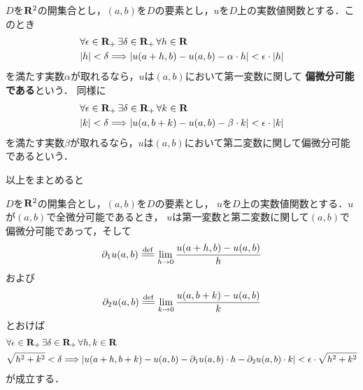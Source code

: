 	\begin{screen}
		\begin{dfn}[偏微分]\label{def:partially_differentiability}
			$D$を$\mathbf{R}^2$の開集合とし，$(a,b)$を$D$の要素とし，$u$を$D$上の実数値関数とする．このとき
			\begin{align}
				&\forall \epsilon \in \mathbf{R}_+\, \exists \delta \in \mathbf{R}_+\, \forall h \in \mathbf{R}\, \\
				&|h| < \delta \Longrightarrow
				\left|u(a+h,b) - u(a,b) - \alpha \cdot h\right| < \epsilon \cdot |h|
			\end{align}
			を満たす実数$\alpha$が取れるなら，$u$は$(a,b)$において第一変数に関して
			{\bf 偏微分可能である}という．
			同様に
			\begin{align}
				&\forall \epsilon \in \mathbf{R}_+\, \exists \delta \in \mathbf{R}_+\, \forall k \in \mathbf{R}\, \\
				&|k| < \delta \Longrightarrow
				\left|u(a,b+k) - u(a,b) - \beta \cdot k\right| < \epsilon \cdot |k|
			\end{align}
			を満たす実数$\beta$が取れるなら，$u$は$(a,b)$において第二変数に関して偏微分可能であるという．
		\end{dfn}
	\end{screen}
	
	以上をまとめると
	
	\begin{screen}
		\begin{thm}[全微分可能なら偏微分可能]
			$D$を$\mathbf{R}^2$の開集合とし，$(a,b)$を$D$の要素とし，
			$u$を$D$上の実数値関数とする．$u$が$(a,b)$で全微分可能であるとき，
			$u$は第一変数と第二変数に関して$(a,b)$で偏微分可能であって，そして
			\begin{align}
				\partial_1 u(a,b) \defeq \lim_{h \to 0} \frac{u(a+h,b) - u(a,b)}{h}
			\end{align}
			および
			\begin{align}
				\partial_2 u(a,b) \defeq \lim_{k \to 0} \frac{u(a,b+k) - u(a,b)}{k}
			\end{align}
			とおけば
			\begin{align}
				&\forall \epsilon \in \mathbf{R}_+\, \exists \delta \in \mathbf{R}_+\, \forall h,k \in \mathbf{R}\, \\
				&\sqrt{h^2 + k^2} < \delta \Longrightarrow
				\left|u(a+h,b+k) - u(a,b) - \partial_1 u(a,b) \cdot h - \partial_2 u(a,b) \cdot k\right| 
				< \epsilon \cdot \sqrt{h^2 + k^2}
			\end{align}
			が成立する．
		\end{thm}
	\end{screen}
	
